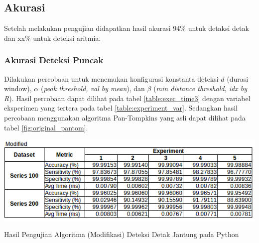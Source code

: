 

\subsection{Akurasi}
Setelah melakukan pengujian didapatkan hasil akurasi 94\% untuk detaksi detak dan xx\% untuk deteksi aritmia.
\subsubsection{Akurasi Deteksi Puncak}
Dilakukan percobaan untuk menemukan konfigurasi konstanta deteksi $d$ (durasi window), $\alpha$ (\textit{peak threshold, val by mean}), dan $\beta$ (\textit{min distance threshold, idx by R}). Hasil percobaan dapat dilihat pada tabel \ref{table:exec_time3} dengan variabel eksperimen yang tertera pada tabel \ref{table:experiment_var}. Sedangkan hasil percobaan menggunakan algoritma Pan-Tompkins yang asli dapat dilihat pada tabel \ref{fig:original_pantom}.

\begin{table}[H]
	\centering
	\includegraphics[scale=0.8]{images/modif_beat_detect.png}	
	\caption{Hasil Pengujian Algoritma (Modifikasi) Deteksi Detak Jantung pada Python}
	\label{table:exec_time3}
\end{table}

